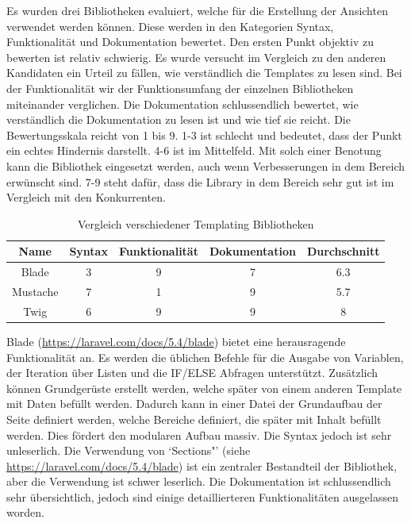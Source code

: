 Es wurden drei Bibliotheken evaluiert, welche für die Erstellung der Ansichten verwendet werden können. Diese werden in den Kategorien Syntax, Funktionalität und Dokumentation bewertet. Den ersten Punkt objektiv zu bewerten ist relativ schwierig. Es wurde versucht im Vergleich zu den anderen Kandidaten ein Urteil zu fällen, wie verständlich die Templates zu lesen sind. Bei der Funktionalität wir der Funktionsumfang der einzelnen Bibliotheken miteinander verglichen. Die Dokumentation schlussendlich bewertet, wie verständlich die Dokumentation zu lesen ist und wie tief sie reicht. Die Bewertungsskala reicht von 1 bis 9. 1-3 ist schlecht und bedeutet, dass der Punkt ein echtes Hindernis darstellt. 4-6 ist im Mittelfeld. Mit solch einer Benotung kann die Bibliothek eingesetzt werden, auch wenn Verbesserungen in dem Bereich erwünscht sind. 7-9 steht dafür, dass die Library in dem Bereich sehr gut ist im Vergleich mit den Konkurrenten.
\begin{table}[H] 
	\caption{Vergleich verschiedener Templating Bibliotheken}
	\centering
	\label{fig:proofofconcept:architektur:anforderungen:ansichten:1}
	\begin{tabular}{ | c | c | c | c | c | } 
		\hline 		
		\rowcolor{tableheadcolor}
		\bfseries Name & \bfseries Syntax & \bfseries Funktionalität & \bfseries Dokumentation & \bfseries Durchschnitt \\ \hline 
		
		Blade & \cellcolor{red!25}3 & \cellcolor{green!25}9 & \cellcolor{green!25}7 & \cellcolor{yellow!25}6.3\\ \hline 
		Mustache & \cellcolor{yellow!25}7 & \cellcolor{red!25}1 & \cellcolor{green!25}9 & \cellcolor{yellow!25}5.7\\ \hline 
		Twig & \cellcolor{green!25}6 & \cellcolor{green!25}9 & \cellcolor{green!25}9 & \cellcolor{green!25}8 \\ \hline 
	\end{tabular}
\end{table}

Blade (\url{https://laravel.com/docs/5.4/blade}) bietet eine herausragende Funktionalität an. Es werden die üblichen Befehle für die Ausgabe von Variablen, der Iteration über Listen und die IF/ELSE Abfragen unterstützt. Zusätzlich können Grundgerüste erstellt werden, welche später von einem anderen Template mit Daten befüllt werden. Dadurch kann in einer Datei der Grundaufbau der Seite definiert werden, welche Bereiche definiert, die später mit Inhalt befüllt werden. Dies fördert den modularen Aufbau massiv. Die Syntax jedoch ist sehr unleserlich. Die Verwendung von `Sections"' (siehe \url{https://laravel.com/docs/5.4/blade}) ist ein zentraler Bestandteil der Bibliothek, aber die Verwendung ist schwer leserlich. Die Dokumentation ist schlussendlich sehr übersichtlich, jedoch sind einige detaillierteren Funktionalitäten ausgelassen worden.

